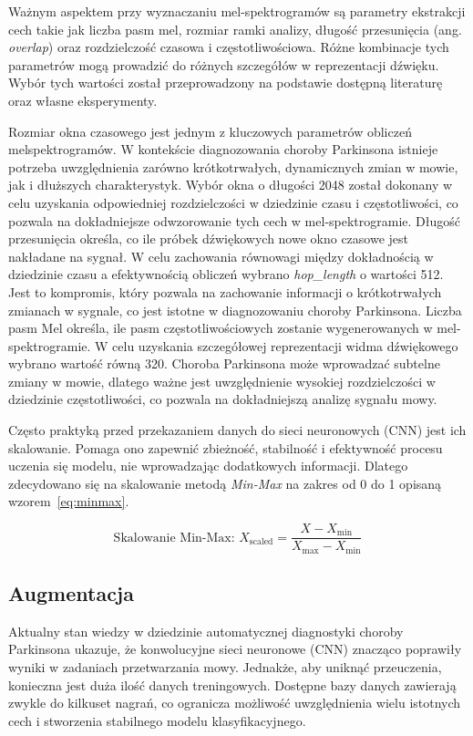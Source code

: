 Ważnym aspektem przy wyznaczaniu mel-spektrogramów są parametry ekstrakcji cech takie jak liczba pasm mel, rozmiar ramki analizy, długość przesunięcia (ang. \emph{overlap}) oraz rozdzielczość czasowa i częstotliwościowa.
Różne kombinacje tych parametrów mogą prowadzić do różnych szczegółów w reprezentacji dźwięku.
Wybór tych wartości został przeprowadzony na podstawie dostępną literaturę oraz własne eksperymenty.

Rozmiar okna czasowego jest jednym z kluczowych parametrów obliczeń melspektrogramów.
W kontekście diagnozowania choroby Parkinsona istnieje potrzeba uwzględnienia zarówno krótkotrwałych, dynamicznych zmian w mowie, jak i dłuższych charakterystyk.
Wybór okna o długości 2048 został dokonany w celu uzyskania odpowiedniej rozdzielczości w dziedzinie czasu i częstotliwości, co pozwala na dokładniejsze odwzorowanie tych cech w mel-spektrogramie.
Długość przesunięcia określa, co ile próbek dźwiękowych nowe okno czasowe jest nakładane na sygnał.
W celu zachowania równowagi między dokładnością w dziedzinie czasu a efektywnością obliczeń wybrano \emph{hop\_length} o wartości 512.
Jest to kompromis, który pozwala na zachowanie informacji o krótkotrwałych zmianach w sygnale, co jest istotne w diagnozowaniu choroby Parkinsona.
Liczba pasm Mel określa, ile pasm częstotliwościowych zostanie wygenerowanych w mel-spektrogramie.
W celu uzyskania szczegółowej reprezentacji widma dźwiękowego wybrano wartość równą 320.
Choroba Parkinsona może wprowadzać subtelne zmiany w mowie, dlatego ważne jest uwzględnienie wysokiej rozdzielczości w dziedzinie częstotliwości, co pozwala na dokładniejszą analizę sygnału mowy.


Często praktyką przed przekazaniem danych do sieci neuronowych (CNN) jest ich skalowanie.
Pomaga ono zapewnić zbieżność, stabilność i efektywność procesu uczenia się modelu, nie wprowadzając dodatkowych informacji.
Dlatego zdecydowano się na skalowanie metodą \emph{Min-Max}  na zakres od 0 do 1 opisaną wzorem~\eqref{eq:minmax}.

\begin{equation}
	\label{eq:minmax}
	\text{Skalowanie Min-Max: } X_{\text{scaled}} = \frac{X - X_{\min}}{X_{\max} - X_{\min}}
\end{equation}

\subsection{Augmentacja}
\label{subsec:augmentacja}

Aktualny stan wiedzy w dziedzinie automatycznej diagnostyki choroby Parkinsona ukazuje, że konwolucyjne sieci neuronowe (CNN) znacząco poprawiły wyniki w zadaniach przetwarzania mowy.
Jednakże, aby uniknąć przeuczenia, konieczna jest duża ilość danych treningowych.
Dostępne bazy danych zawierają zwykle do kilkuset nagrań, co ogranicza możliwość uwzględnienia wielu istotnych cech i stworzenia stabilnego modelu klasyfikacyjnego.

